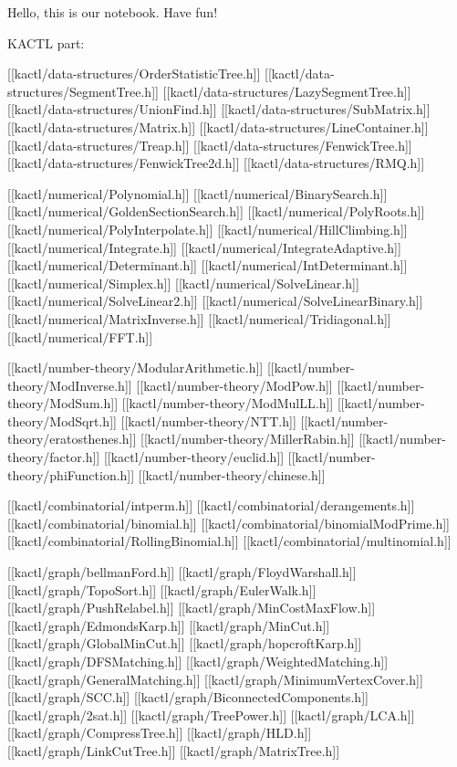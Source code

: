 

Hello, this is our notebook. Have fun!

KACTL part:

[[kactl/data-structures/OrderStatisticTree.h]]
[[kactl/data-structures/SegmentTree.h]]
[[kactl/data-structures/LazySegmentTree.h]]
[[kactl/data-structures/UnionFind.h]]
[[kactl/data-structures/SubMatrix.h]]
[[kactl/data-structures/Matrix.h]]
[[kactl/data-structures/LineContainer.h]]
[[kactl/data-structures/Treap.h]]
[[kactl/data-structures/FenwickTree.h]]
[[kactl/data-structures/FenwickTree2d.h]]
[[kactl/data-structures/RMQ.h]]

[[kactl/numerical/Polynomial.h]]
[[kactl/numerical/BinarySearch.h]]
[[kactl/numerical/GoldenSectionSearch.h]]
[[kactl/numerical/PolyRoots.h]]
[[kactl/numerical/PolyInterpolate.h]]
[[kactl/numerical/HillClimbing.h]]
[[kactl/numerical/Integrate.h]]
[[kactl/numerical/IntegrateAdaptive.h]]
[[kactl/numerical/Determinant.h]]
[[kactl/numerical/IntDeterminant.h]]
[[kactl/numerical/Simplex.h]]
[[kactl/numerical/SolveLinear.h]]
[[kactl/numerical/SolveLinear2.h]]
[[kactl/numerical/SolveLinearBinary.h]]
[[kactl/numerical/MatrixInverse.h]]
[[kactl/numerical/Tridiagonal.h]]
[[kactl/numerical/FFT.h]]

[[kactl/number-theory/ModularArithmetic.h]]
[[kactl/number-theory/ModInverse.h]]
[[kactl/number-theory/ModPow.h]]
[[kactl/number-theory/ModSum.h]]
[[kactl/number-theory/ModMulLL.h]]
[[kactl/number-theory/ModSqrt.h]]
[[kactl/number-theory/NTT.h]]
[[kactl/number-theory/eratosthenes.h]]
[[kactl/number-theory/MillerRabin.h]]
[[kactl/number-theory/factor.h]]
[[kactl/number-theory/euclid.h]]
[[kactl/number-theory/phiFunction.h]]
[[kactl/number-theory/chinese.h]]

[[kactl/combinatorial/intperm.h]]
[[kactl/combinatorial/derangements.h]]
[[kactl/combinatorial/binomial.h]]
[[kactl/combinatorial/binomialModPrime.h]]
[[kactl/combinatorial/RollingBinomial.h]]
[[kactl/combinatorial/multinomial.h]]

[[kactl/graph/bellmanFord.h]]
[[kactl/graph/FloydWarshall.h]]
[[kactl/graph/TopoSort.h]]
[[kactl/graph/EulerWalk.h]]
[[kactl/graph/PushRelabel.h]]
[[kactl/graph/MinCostMaxFlow.h]]
[[kactl/graph/EdmondsKarp.h]]
[[kactl/graph/MinCut.h]]
[[kactl/graph/GlobalMinCut.h]]
[[kactl/graph/hopcroftKarp.h]]
[[kactl/graph/DFSMatching.h]]
[[kactl/graph/WeightedMatching.h]]
[[kactl/graph/GeneralMatching.h]]
[[kactl/graph/MinimumVertexCover.h]]
[[kactl/graph/SCC.h]]
[[kactl/graph/BiconnectedComponents.h]]
[[kactl/graph/2sat.h]]
[[kactl/graph/TreePower.h]]
[[kactl/graph/LCA.h]]
[[kactl/graph/CompressTree.h]]
[[kactl/graph/HLD.h]]
[[kactl/graph/LinkCutTree.h]]
[[kactl/graph/MatrixTree.h]]

